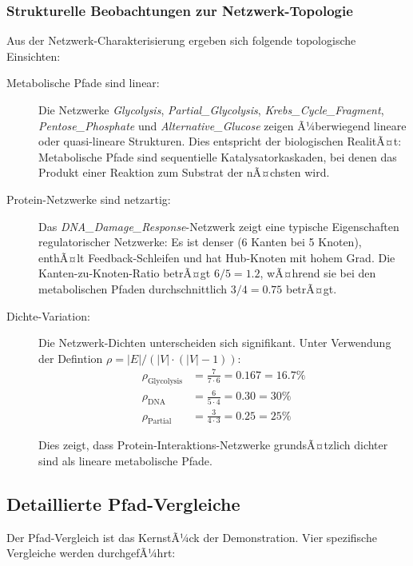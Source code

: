 ﻿\documentclass[a4paper,12pt]{article}
\theoremstyle{definition}
\begin{document}
\subsubsection{Strukturelle Beobachtungen zur Netzwerk-Topologie}

Aus der Netzwerk-Charakterisierung ergeben sich folgende topologische Einsichten:

\begin{description}
	\item[Metabolische Pfade sind linear:] Die Netzwerke \textit{Glycolysis}, \textit{Partial\_Glycolysis}, \textit{Krebs\_\newline Cycle\_Fragment}, \textit{Pentose\_Phosphate} und \textit{Alternative\_Glucose} zeigen Ã¼berwiegend lineare oder quasi-lineare Strukturen. Dies entspricht der biologischen RealitÃ¤t: Metabolische Pfade sind sequentielle Katalysatorkaskaden, bei denen das Produkt einer Reaktion zum Substrat der nÃ¤chsten wird.
	
	\item[Protein-Netzwerke sind netzartig:] Das \textit{DNA\_Damage\_Response}-Netzwerk zeigt eine typische Eigenschaften regulatorischer Netzwerke: Es ist denser (6 Kanten bei 5 Knoten), enthÃ¤lt Feedback-Schleifen und hat Hub-Knoten mit hohem Grad. Die Kanten-zu-Knoten-Ratio betrÃ¤gt $6/5 = 1.2$, wÃ¤hrend sie bei den metabolischen Pfaden durchschnittlich $3/4 = 0.75$ betrÃ¤gt.
	
	\item[Dichte-Variation:] Die Netzwerk-Dichten unterscheiden sich signifikant. Unter Verwendung der Defintion $\rho = |E| / (|V| \cdot (|V|-1))$:
	\begin{align*}
		\rho_{\text{Glycolysis}} &= \frac{7}{7 \cdot 6} = 0.167 = 16.7\% \\
		\rho_{\text{DNA}} &= \frac{6}{5 \cdot 4} = 0.30 = 30\% \\
		\rho_{\text{Partial}} &= \frac{3}{4 \cdot 3} = 0.25 = 25\%
	\end{align*}
	
	Dies zeigt, dass Protein-Interaktions-Netzwerke grundsÃ¤tzlich dichter sind als lineare metabolische Pfade.
\end{description}

\subsection{Detaillierte Pfad-Vergleiche}

Der Pfad-Vergleich ist das KernstÃ¼ck der Demonstration. Vier spezifische Vergleiche werden durchgefÃ¼hrt:
\end{document}
